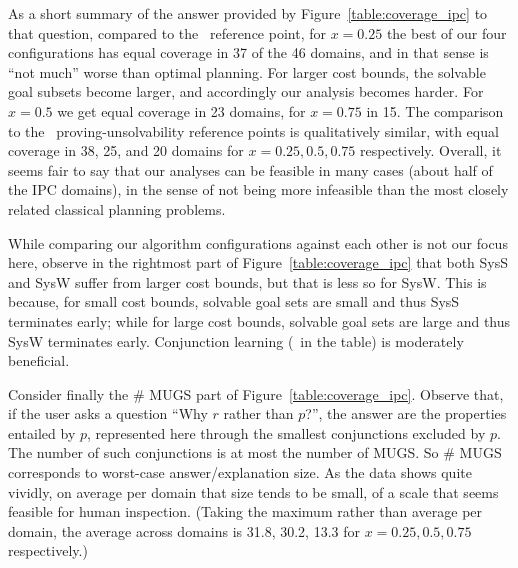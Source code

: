 As a short summary of the answer provided by
Figure~\ref{table:coverage_ipc} to that question, compared to
the \hlmcut\ reference point, for $x=0.25$ the best of our four
configurations has equal coverage in 37 of the 46 domains, and in that
sense is ``not much'' worse than optimal planning. For larger cost
bounds, the solvable goal subsets become larger, and accordingly our
analysis becomes harder. For $x=0.5$ we get equal coverage in 23
domains, for $x=0.75$ in 15. The comparison to the \hc\
proving-unsolvability reference points is qualitatively similar, with
equal coverage in 38, 25, and 20 domains for $x=0.25, 0.5, 0.75$
respectively. Overall, it seems fair to say that our analyses can be
feasible in many cases (about half of the IPC domains), in the sense
of not being more infeasible than the most closely related classical
planning problems.

While comparing our algorithm configurations against each other is not
our focus here, observe in the rightmost part of
Figure~\ref{table:coverage_ipc} that both SysS and SysW suffer from
larger cost bounds, but that is less so for SysW. This is because, for
small cost bounds, solvable goal sets are small and thus SysS
terminates early; while for large cost bounds, solvable goal sets are
large and thus SysW terminates early. Conjunction learning (\hc\ in
the table) is moderately beneficial.
%
%

Consider finally the \# MUGS part of
Figure~\ref{table:coverage_ipc}. Observe that, if the user asks a
question ``Why $r$ rather than $p$?'', the answer are the properties
entailed by $p$, represented here through the smallest conjunctions
excluded by $p$. The number of such conjunctions is at most the number
of MUGS. So \# MUGS corresponds to worst-case answer/explanation
size. As the data shows quite vividly, on average per domain that size
tends to be small, of a scale that seems feasible for human
inspection. (Taking the maximum rather than average per domain, the
average across domains is 31.8, 30.2, 13.3 for $x=0.25, 0.5, 0.75$
respectively.)

